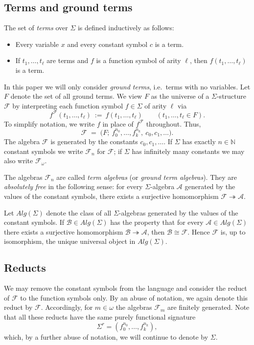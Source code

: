 \documentclass[a4paper,11pt]{article}
\begin{document}
\subsection{Terms and ground terms}
The set of \emph{terms} over $\Sigma$ is defined inductively as follows:
\begin{itemize}
\item Every variable $x$ and every constant symbol $c$ is a term.
\item If $t_1,\ldots,t_\ell$ are terms and $f$ is a function symbol of arity $\ell$, then $f(t_1,\ldots,t_\ell)$ is a term.
\end{itemize}
In this paper we will only consider \emph{ground terms}, i.e.\ terms with no variables. Let $F$ denote the set of all ground terms. We view $F$ as the universe of a $\Sigma$-structure $\mathcal{F}$ by interpreting each function symbol $f\in\Sigma$ of arity $\ell$ via
\[
f^{\mathcal{F}}(t_1,\ldots,t_\ell)\ :=\ f(t_1,\ldots,t_\ell)
\qquad(t_1,\ldots,t_\ell\in F).
\]
To simplify notation, we write $f$ in place of $f^{\mathcal{F}}$ throughout. Thus,
\[
\mathcal{F}\;=\;\bigl(F;\ f_0^{n_0},\ldots,f_k^{n_k},\ c_0,c_1,\ldots \bigr).
\]
The algebra $\mathcal{F}$ is generated by the constants $c_0,c_1,\ldots$. If $\Sigma$ has exactly $n\in\mathbb{N}$ constant symbols we write $\mathcal{F}_n$ for $\mathcal{F}$; if $\Sigma$ has infinitely many constants we may also write $\mathcal{F}_\omega$.

The algebras $\mathcal{F}_n$ are called \emph{term algebras} (or \emph{ground term algebras}). They are \emph{absolutely free} in the following sense: for every $\Sigma$-algebra $\mathcal{A}$ generated by the values of the constant symbols, there exists a surjective homomorphism $\mathcal{F}\twoheadrightarrow \mathcal{A}$.

Let $Alg(\Sigma)$ denote the class of all $\Sigma$-algebras generated by the values of the constant symbols. If $\mathcal{B}\in Alg(\Sigma)$ has the property that for every $\mathcal{A}\in Alg(\Sigma)$ there exists a surjective homomorphism $\mathcal{B}\twoheadrightarrow \mathcal{A}$, then $\mathcal{B}\cong\mathcal{F}$. Hence $\mathcal{F}$ is, up to isomorphism, the unique universal object in $ Alg(\Sigma)$.

\subsection{Reducts}
We may remove the constant symbols from the language and consider the reduct of $\mathcal{F}$ to the function symbols only. By an abuse of notation, we again denote this reduct by $\mathcal{F}$. Accordingly, for $m\in\omega$ the algebras $\mathcal{F}_m$ are finitely generated. Note that all these reducts have the same purely functional signature
\[
\Sigma^{r}=(f_0^{n_0},\ldots,f_k^{n_k}),
\]
which, by a further abuse of notation, we will continue to denote by $\Sigma$.
\end{document}
